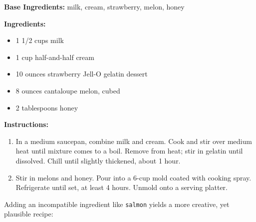 \begin{tcolorbox}[recipebox={Melon-Jello Mold}]
	\textbf{Base Ingredients:} milk, cream, strawberry, melon, honey

	\vspace{0.5em}
	\textbf{Ingredients:}
	\begin{itemize}
		\item 1 1/2 cups milk
		\item 1 cup half-and-half cream
		\item 10 ounces strawberry Jell-O gelatin dessert
		\item 8 ounces cantaloupe melon, cubed
		\item 2 tablespoons honey
	\end{itemize}

	\vspace{0.5em}
	\textbf{Instructions:}
	\begin{enumerate}
		\item In a medium saucepan, combine milk and cream. Cook and stir over medium heat until mixture comes to a boil. Remove from heat; stir in gelatin until dissolved. Chill until slightly thickened, about 1 hour.
		\item Stir in melons and honey. Pour into a 6-cup mold coated with cooking spray. Refrigerate until set, at least 4 hours. Unmold onto a serving platter.
	\end{enumerate}
\end{tcolorbox}

Adding an incompatible ingredient like \texttt{salmon} yields a more creative, yet plausible recipe:

